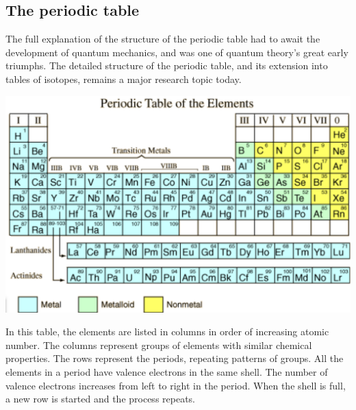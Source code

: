 \documentclass[11pt]{article}
\theoremstyle{break}
\theoremstyle{break}
\begin{document}
\subsection{The periodic table}
The full explanation of the structure of the periodic table had to await the development of quantum mechanics, and was one of quantum theory's great early triumphs. The detailed structure of the periodic table, and its extension into tables of isotopes, remains a major research topic today.\\
\begin{center}
\includegraphics[scale=0.54]{ptable}
\end{center}
In this table, the elements are listed in columns in order of increasing atomic number. The columns represent groups of elements with similar chemical properties. The rows represent the periods, repeating patterns of groups. All the elements in a period have valence electrons in the same shell. The number of valence electrons increases from left to right in the period. When the shell is full, a new row is started and the process repeats.\\
\end{document}

